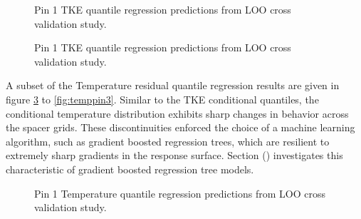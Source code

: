 \begin{figure}[H]%
    \centering
    \qquad
    \caption[Q-Q LOO TKE pin 2 results.]{Pin 1 TKE quantile regression predictions from LOO cross validation study.}%
    \label{fig:tkepin2}%
\end{figure}

\begin{figure}[H]%
    \centering
    \qquad
    \caption[Q-Q LOO TKE pin 3 results.]{Pin 1 TKE quantile regression predictions from LOO cross validation study.}%
    \label{fig:tkepin3}%
\end{figure}


A subset of the Temperature residual quantile regression results are given in figure \ref{fig:temppin1} to \ref{fig:temppin3}.  Similar to the TKE conditional quantiles, the conditional temperature distribution exhibits sharp changes in behavior across the spacer grids.  These discontinuities enforced the choice of a machine learning algorithm, such as gradient boosted regression trees, which are resilient to extremely sharp gradients in the response surface.  Section () investigates this characteristic of gradient boosted regression tree models.

\begin{figure}[H]%
    \centering
    \qquad
    \caption[Q-Q LOO Temperature pin 1 results.]{Pin 1 Temperature quantile regression predictions from LOO cross validation study.}%
    \label{fig:temppin1}%
\end{figure}


